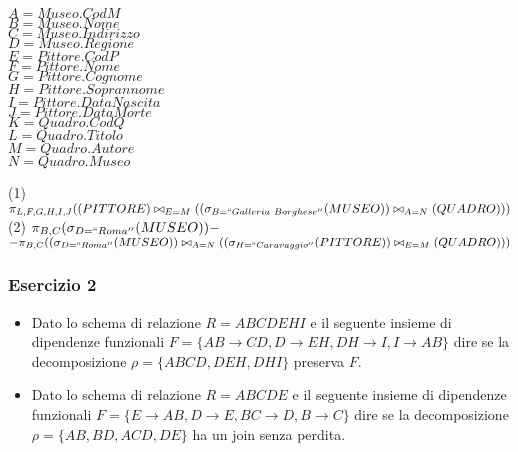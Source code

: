   \begin{multicols}{3}
  \begin{flushleft}
   $A = Museo.CodM$\\
   $B = Museo.Nome$\\
   $C = Museo.Indirizzo$\\
   $D = Museo.Regione$\\
   $E = Pittore.CodP$\\
   $F = Pittore.Nome$\\
   $G = Pittore.Cognome$\\
   $H = Pittore.Soprannome$\\
   $I = Pittore.DataNascita$\\
   $J = Pittore.DataMorte$\\
   $K = Quadro.CodQ$\\
   $L = Quadro.Titolo$\\
   $M = Quadro.Autore$\\
   $N = Quadro.Museo$\\
  \end{flushleft}
  \end{multicols}

 \noindent(1) $\pi_{L, F, G, H, I, J}((PITTORE)\bowtie_{E=M}((\sigma_{B=``Galleria\ Borghese''}(MUSEO))\bowtie_{A=N}(QUADRO)))$\\
 (2) $\pi_{B,C}(\sigma_{D=``Roma''}(MUSEO)) - $\\ 
 $-\pi_{B,C}((\sigma_{D=``Roma''}(MUSEO))\bowtie_{A=N}((\sigma_{H=``Caravaggio''}(PITTORE))\bowtie_{E=M}(QUADRO)))$\\

 \subsubsection{Esercizio 2}
\begin{itemize}
  \item Dato lo schema di relazione $R = ABCDEHI$ e il seguente insieme di dipendenze funzionali $F=\{AB\rightarrow CD, 
  D\rightarrow EH, DH\rightarrow I, I\rightarrow AB\}$ dire se la decomposizione $\rho =\{ABCD, DEH, DHI\}$ preserva $F$.

  \item Dato lo schema di relazione $R = ABCDE$ e il seguente insieme di dipendenze funzionali $F=\{E\rightarrow AB, D\rightarrow E,
  BC\rightarrow D, B\rightarrow C\}$ dire se la decomposizione $\rho =\{AB, BD, ACD, DE\}$ ha un join senza perdita.
 \end{itemize}
 
